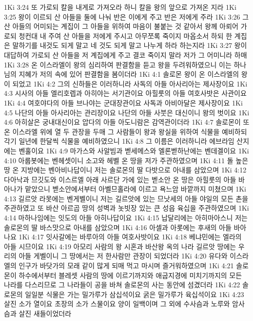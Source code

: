 1Ki 3:24  또 가로되 칼을 내게로 가져오라 하니 칼을 왕의 앞으로 가져온 지라
1Ki 3:25  왕이 이르되 산 아들을 둘에 나눠 반은 이에게 주고 반은 저에게 주라
1Ki 3:26  그 산 아들의 어미되는 계집이 그 아들을 위하여 마음이 불붙는 것 같아서 왕께 아뢰어 가로되 청컨대 내 주여 산 아들을 저에게 주시고 아무쪼록 죽이지 마옵소서 하되 한 계집은 말하기를 내것도 되게 말고 네 것도 되게 말고 나누게 하라 하는지라
1Ki 3:27  왕이 대답하여 가로되 산 아들을 저 계집에게 주고 결코 죽이지 말라 저가 그 어미니라 하매
1Ki 3:28  온 이스라엘이 왕의 심리하여 판결함을 듣고 왕을 두려워하였으니 이는 하나님의 지혜가 저의 속에 있어 판결함을 봄이더라
1Ki 4:1  솔로몬 왕이 온 이스라엘의 왕이 되었고
1Ki 4:2  그의 신하들은 이러하니라 사독의 아들 아사리아는 제사장이요
1Ki 4:3  시사의 아들 엘리호렙과 아히야는 서기관이요 아힐룻의 아들 여호사밧은 사관이요
1Ki 4:4  여호야다의 아들 브나야는 군대장관이요 사독과 아비아달은 제사장이요
1Ki 4:5  나단의 아들 아사리아는 관리장이요 나단의 아들 사붓은 대신이니 왕의 벗이요
1Ki 4:6  아히살은 궁내대신이요 압다의 아들 아도니람은 감역관이더라
1Ki 4:7  솔로몬이 또 온 이스라엘 위에 열 두 관장을 두매 그 사람들이 왕과 왕실을 위하여 식물을 예비하되 각기 일년에 한달씩 식물을 예비하였으니
1Ki 4:8  그 이름은 이러하니라 에브라임 산지에는 벤훌이요
1Ki 4:9  마가스와 사알빔과 벧세메스와 엘론벧하난에는 벤데겔이요
1Ki 4:10  아룹봇에는 벤헤셋이니 소고와 헤벨 온 땅을 저가 주관하였으며
1Ki 4:11  돌 높은 땅 온 지방에는 벤아비나답이니 저는 솔로몬의 딸 다밧으로 아내를 삼았으며
1Ki 4:12  다아낙과 므깃도와 이스르엘 아래 사르단 가에 있는 벧소안 온 땅은 아힐룻의 아들 바아나가 맡았으니 벧소안에서부터 아벨므홀라에 이르고 욕느암 바깥까지 미쳤으며
1Ki 4:13  길르앗 라못에는 벤게벨이니 저는 길르앗에 있는 므낫세의 아들 야일의 모든 촌을 주관하였고 또 바산 아르곱 땅의 성벽과 놋빗장 있는 큰 성읍 육십을 주관하였으며
1Ki 4:14  마하나임에는 잇도의 아들 아히나답이요
1Ki 4:15  납달리에는 아히마아스니 저는 솔로몬의 딸 바스맛으로 아내를 삼았으며
1Ki 4:16  아셀과 아롯에는 후새의 아들 바아나요
1Ki 4:17  잇사갈에는 바루아의 아들 여호사밧이요
1Ki 4:18  베냐민에는 엘라의 아들 시므이요
1Ki 4:19  아모리 사람의 왕 시혼과 바산왕 옥의 나라 길르앗 땅에는 우리의 아들 게벨이니 그 땅에서는 저 한사람만 관장이 되었더라
1Ki 4:20  유다와 이스라엘의 인구가 바닷가의 모래 같이 많게 되매 먹고 마시며 즐거워하였으며
1Ki 4:21  솔로몬이 하수에서부터 블레셋 사람의 땅에 이르기까지와 애굽지경에 미치기까지의 모든 나라를 다스리므로 그 나라들이 공을 바쳐 솔로몬의 사는 동안에 섬겼더라
1Ki 4:22  솔로몬의 일일분 식물은 가는 밀가루가 삼십석이요 굵은 밀가루가 육십석이요
1Ki 4:23  살진 소가 열이요 초장의 소가 스물이요 양이 일백이며 그 외에 수사슴과 노루와 암사슴과 살진 새들이었더라
